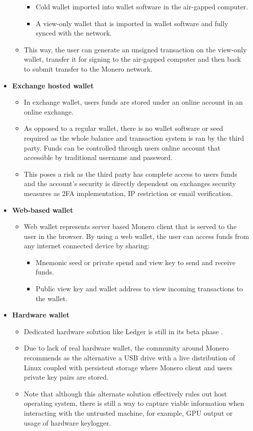 \documentclass[
  printed, %
  table,   %
  nolof,     %
  nolot,     %
           oneside, color
]{fithesis3}
\begin{document}
\begin{itemize}
\begin{itemize}
\begin{itemize}\itemsep0em
\item Cold wallet imported into wallet software in the air-gapped computer.
\item A view-only wallet that is imported in wallet software and fully synced with the network. 
\end{itemize}
\item This way, the user can generate an unsigned transaction on the view-only wallet, transfer it for signing to the air-gapped computer and then back to submit transfer to the Monero network.
\end{itemize}
\item \textbf{Exchange hosted wallet}
\begin{itemize}\itemsep0em
\item In exchange wallet, users funds are stored under an online account in an online exchange. 
\item As opposed to a regular wallet, there is no wallet software or seed required as the whole balance and transaction system is ran by the third party.
Funds can be controlled through users online account that accessible by traditional username and password. 
\item This poses a risk as the third party has complete access to users funds and the account's security is directly dependent on exchanges security measures as 2FA implementation, IP restriction or email verification.
\end{itemize}
\item \textbf{Web-based wallet}
\begin{itemize}\itemsep0em
\item Web wallet represents server based Monero client that is served to the user in the browser. By using a web wallet, the user can access funds from any internet connected device by sharing:
\begin{itemize}\itemsep0em
\item Mnemonic seed or private spend and view key to send and receive funds.
\item Public view key and wallet address to view incoming transactions to the wallet.
\end{itemize}
\end{itemize}
\item \textbf{Hardware wallet}
\begin{itemize}\itemsep0em
\item Dedicated hardware solution like Ledger is still in its beta phase \cite{ledgermonero}.
\item Due to lack of real hardware wallet, the community around Monero recommends as the alternative a USB drive with a live distribution of Linux coupled with persistent storage where Monero client and users private key pairs are stored. 
\item Note that although this alternate solution effectively rules out host operating system, there is still a way to capture viable information when interacting with the untrusted machine, for example, GPU output or usage of hardware keylogger.


\end{itemize}
\end{itemize}
\end{document}
